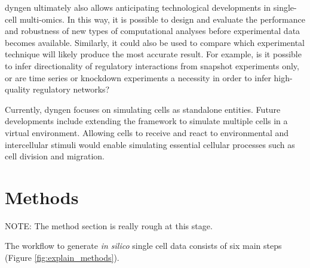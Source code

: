 dyngen ultimately also allows anticipating technological developments in single-cell multi-omics. In this way, it is possible to design and evaluate the performance and robustness of new types of computational analyses before experimental data becomes available.
Similarly, it could also be used to compare which experimental technique will likely produce the most accurate result. For example, is it possible to infer directionality of regulatory interactions from snapshot experiments only, or are time series or knockdown experiments a necessity in order to infer high-quality regulatory networks?

Currently, dyngen focuses on simulating cells as standalone entities.
Future developments include extending the framework to simulate multiple cells in a virtual environment. Allowing cells to receive and react to environmental and intercellular stimuli would enable simulating essential cellular processes such as cell division and migration. 
\section{Methods}
NOTE: The method section is really rough at this stage.

The workflow to generate \textit{in silico} single cell data consists of six main steps (Figure \ref{fig:explain_methods}). 

